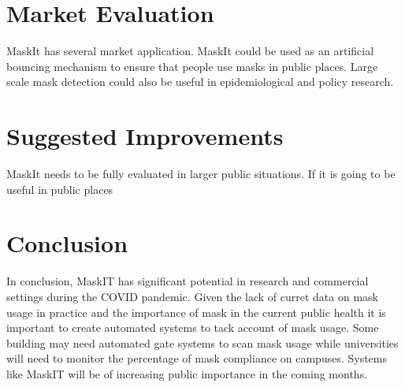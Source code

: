\documentclass[conference, 12pt, onecolumn]{IEEEtran}
\begin{document}
\section{Market Evaluation}
MaskIt has several market application. MaskIt could be used as an artificial bouncing mechanism to ensure that people use masks in public places. Large scale mask detection could also be useful in epidemiological and policy research. 
\section{Suggested Improvements}
MaskIt needs to be fully evaluated in larger public situations. If it is going to be useful in public places 
\section{Conclusion}
In conclusion, MaskIT has significant potential in research and commercial settings during the COVID pandemic. Given the lack of curret data on mask usage in practice and the importance of mask in the current public health it is important to create automated systems to tack account of mask usage. Some building may need automated gate systems to scan mask usage while universities will need to monitor the percentage of mask compliance on campuses. Systems like MaskIT will be of increasing public importance in the coming months. 



\end{document}
